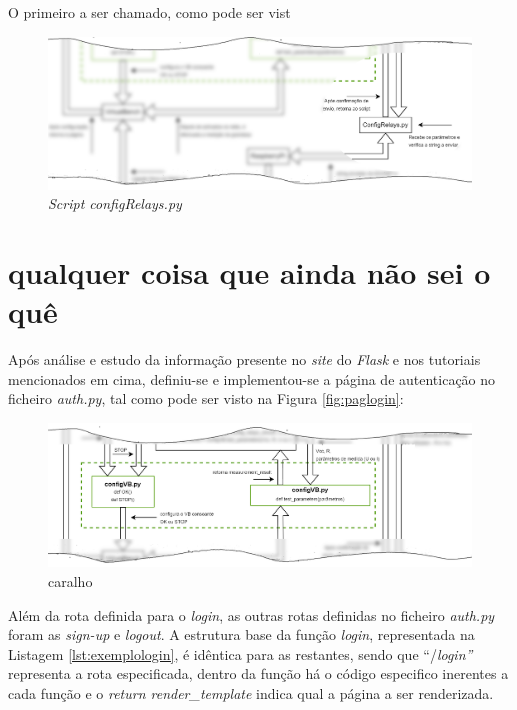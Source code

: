 O primeiro a ser chamado, como pode ser vist
\begin{figure}[hbtp]
	\centering
	\includegraphics[width=1\textwidth]{figures/ohm_diagramaCUTRelay.drawio.png}
	\caption{\textit{Script configRelays.py}}
	\label{fig:cutconfigRelays}
\end{figure}

\section{qualquer coisa que ainda não sei o quê}

Após análise e estudo da informação presente no \textit{site} do \textit{Flask} e nos tutoriais mencionados em cima, definiu-se e implementou-se a página de autenticação no ficheiro \textit{auth.py}, tal como pode ser visto na Figura \ref{fig:paglogin}:

\begin{figure}[hbtp]
	\centering
	\includegraphics[width=1\textwidth]{figures/ohm_diagramaCUT.drawio.png}
	\caption{caralho}
	\label{fig:diagramaCUT}
\end{figure}

Além da rota definida para o \textit{login}, as outras rotas definidas no ficheiro \textit{auth.py} foram as \textit{sign-up} e \textit{logout}. A estrutura base da função \textit{login}, representada na Listagem \ref{lst:exemplologin}, é idêntica para as restantes, sendo que ``/\textit{login''} representa a rota especificada, dentro da função há o código especifico inerentes a cada função e o \textit{return render\_template} indica qual a página a ser renderizada.